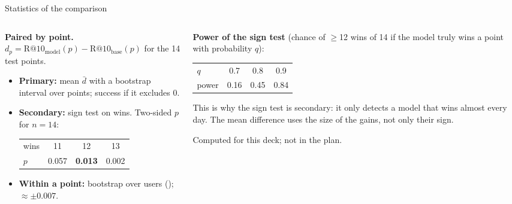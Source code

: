 \documentclass[aspectratio=169,10pt]{beamer}
\newcommand{\toindex}{\hfill\hyperlink{index}{\beamerreturnbutton{index}}}
\begin{document}
\begin{frame}[label=stats]{Statistics of the comparison \toindex}
  \small
  \begin{columns}[T]
    \begin{column}{0.5\textwidth}
      \textbf{Paired by point.} $d_p = \text{R@10}_{\text{model}}(p) - \text{R@10}_{\text{base}}(p)$ for the 14 test points.
      \begin{itemize}
        \item \textbf{Primary:} mean $\bar d$ with a bootstrap interval over points; success if it excludes 0.
        \item \textbf{Secondary:} sign test on wins. Two-sided $p$ for $n=14$:
          \begin{tabular}{@{}lccc@{}}
            wins & 11 & 12 & 13 \\
            $p$ & 0.057 & \textbf{0.013} & 0.002 \\
          \end{tabular}
        \item \textbf{Within a point:} bootstrap over users (); $\approx\pm0.007$.
      \end{itemize}
    \end{column}
    \begin{column}{0.47\textwidth}
      \textbf{Power of the sign test} (chance of $\geq$12 wins of 14 if the model truly wins a point with probability $q$):
      \par\smallskip
      \centering
      \begin{tabular}{@{}lccc@{}}
        \toprule
        $q$ & 0.7 & 0.8 & 0.9 \\
        power & 0.16 & 0.45 & 0.84 \\
        \bottomrule
      \end{tabular}
      \par\medskip\raggedright
      This is why the sign test is secondary: it only detects a model that wins almost every day. The mean difference uses the size of the gains, not only their sign.
      \par\smallskip
      {\color{grey}\scriptsize Computed for this deck; not in the plan.}
    \end{column}
  \end{columns}
\end{frame}
\end{document}
